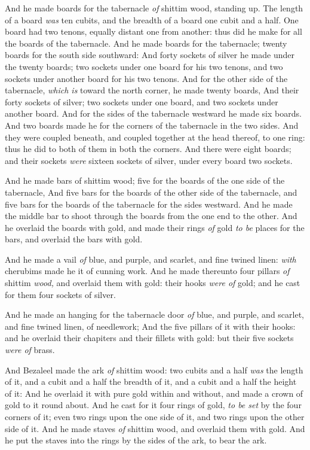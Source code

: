 \documentclass[11pt,letterpaper,oneside]{memoir}
\begin{document}
And he made boards for the tabernacle \emph{of} shittim wood, standing
up. The length of a board \emph{was} ten cubits, and the breadth of a
board one cubit and a half. One board had two tenons, equally distant
one from another: thus did he make for all the boards of the tabernacle.
And he made boards for the tabernacle; twenty boards for the south side
southward: And forty sockets of silver he made under the twenty boards;
two sockets under one board for his two tenons, and two sockets under
another board for his two tenons. And for the other side of the
tabernacle, \emph{which is} toward the north corner, he made twenty
boards, And their forty sockets of silver; two sockets under one board,
and two sockets under another board. And for the sides of the tabernacle
westward he made six boards. And two boards made he for the corners of
the tabernacle in the two sides. And they were coupled beneath, and
coupled together at the head thereof, to one ring: thus he did to both
of them in both the corners. And there were eight boards; and their
sockets \emph{were} sixteen sockets of silver, under every board two
sockets.

And he made bars of shittim wood; five for the boards of the one side of
the tabernacle, And five bars for the boards of the other side of the
tabernacle, and five bars for the boards of the tabernacle for the sides
westward. And he made the middle bar to shoot through the boards from
the one end to the other. And he overlaid the boards with gold, and made
their rings \emph{of} gold \emph{to be} places for the bars, and overlaid the
bars with gold.

And he made a vail \emph{of} blue, and purple, and scarlet, and fine
twined linen: \emph{with} cherubims made he it of cunning work. And he
made thereunto four pillars \emph{of} shittim \emph{wood,} and overlaid
them with gold: their hooks \emph{were of} gold; and he cast for them
four sockets of silver.

And he made an hanging for the tabernacle door \emph{of} blue, and
purple, and scarlet, and fine twined linen, of needlework; And the five
pillars of it with their hooks: and he overlaid their chapiters and
their fillets with gold: but their five sockets \emph{were of} brass.

And Bezaleel made the ark \emph{of} shittim wood: two cubits and a half
\emph{was} the length of it, and a cubit and a half the breadth of it,
and a cubit and a half the height of it: And he overlaid it with pure
gold within and without, and made a crown of gold to it round about. And
he cast for it four rings of gold, \emph{to be set} by the four corners
of it; even two rings upon the one side of it, and two rings upon the
other side of it. And he made staves \emph{of} shittim wood, and
overlaid them with gold. And he put the staves into the rings by the
sides of the ark, to bear the ark.
\end{document}
